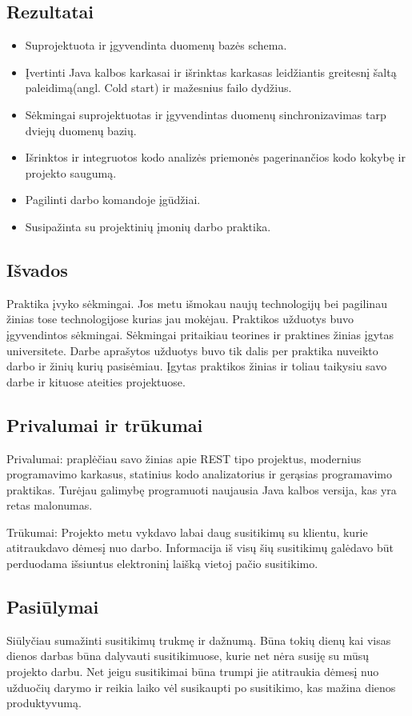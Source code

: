 \documentclass{VUMIFPSkursinis}
\begin{document}
	\subsection{Rezultatai}
		\begin{itemize}
			\item{Suprojektuota ir įgyvendinta duomenų bazės schema.}
			\item{Įvertinti Java kalbos karkasai ir išrinktas karkasas leidžiantis greitesnį šaltą paleidimą(angl. Cold start) ir mažesnius failo dydžius.}
			\item{Sėkmingai suprojektuotas ir įgyvendintas duomenų sinchronizavimas tarp dviejų duomenų bazių.}
			\item{Išrinktos ir integruotos kodo analizės priemonės pagerinančios kodo kokybę ir projekto saugumą.}
			\item{Pagilinti darbo komandoje įgūdžiai.}
			\item{Susipažinta su projektinių įmonių darbo praktika.}
		\end{itemize}
		
	\subsection{Išvados}
		Praktika įvyko sėkmingai. Jos metu išmokau naujų technologijų bei pagilinau žinias tose technologijose kurias jau mokėjau. 
		Praktikos užduotys buvo įgyvendintos sėkmingai. Sėkmingai pritaikiau teorines ir praktines žinias įgytas universitete.
		Darbe aprašytos užduotys buvo tik dalis per praktika nuveikto darbo ir žinių kurių pasisėmiau.
		Įgytas praktikos žinias ir toliau taikysiu savo darbe ir kituose ateities projektuose.
		
	\subsection{Privalumai ir trūkumai}
		Privalumai: praplėčiau savo žinias apie REST tipo projektus, modernius programavimo karkasus, statinius kodo analizatorius ir gerąsias programavimo
		praktikas. Turėjau galimybę programuoti naujausia Java kalbos versija, kas yra retas malonumas.  

		Trūkumai: Projekto metu vykdavo labai daug susitikimų su klientu, kurie atitraukdavo dėmesį nuo darbo. Informacija iš visų šių susitikimų galėdavo būt perduodama išsiuntus elektroninį laišką vietoj pačio susitikimo.

	\subsection{Pasiūlymai}
		Siūlyčiau sumažinti susitikimų trukmę ir dažnumą. Būna tokių dienų kai visas dienos darbas būna dalyvauti susitikimuose, kurie net nėra susiję su mūsų 
		projekto darbu. Net jeigu susitikimai būna trumpi jie atitraukia dėmesį nuo užduočių darymo ir reikia laiko vėl susikaupti po susitikimo, kas mažina dienos produktyvumą.
		
\printbibliography[heading=bibintoc]
\end{document}
